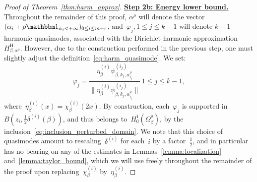 \documentclass[10pt]{article}
\newcommand{\1}{\mathbbm 1}
\newcommand{\deltaRadius}[1]{\delta^{(#1)}} %
\newcommand{\shift}{\rho} %
\begin{document}
\begin{proof}[Proof of Theorem~\ref{thm:harm_approx}]
        {\underline{\bf Step 2b: Energy lower bound.}\newline}
        Throughout the remainder of this proof, $\alpha^\shift$ will denote the vector~$(\alpha_i+\shift\1_{\alpha_i<+\infty})_{0\leq i\leq m+r}$, and~$\varphi_{j}, 1\leq j \leq k-1$ will denote $k-1$ harmonic quasimodes, associated with the Dirichlet harmonic approximation~$H^{\mathrm{H}}_{\beta,\alpha^\shift}$.
        However, due to the construction performed in the previous step, one must slightly adjust the definition~\eqref{eq:harm_quasimode}.
        We set:
        \[\varphi_j = \frac{\eta_\beta^{(i)}\psi_{\beta,k_j,\alpha^\shift_{i_j}}^{(i_j)}}{\|\eta_\beta^{(i)}\psi_{\beta,k_j,\alpha^\shift_{i_j}}^{(i_j)}\|}\,1\leq j\leq k-1,\]
        where~$\eta_\beta^{(i)}(x) = \chi_\beta^{(i)}(2x)$.
        By construction, each~$\varphi_j$ is supported in~$B(z_i,\frac12\deltaRadius{i}(\beta))$, and thus belongs to~$H_0^1(\Omega_\beta^\shift)$, by the inclusion~\eqref{eq:inclusion_perturbed_domain}.
        We note that this choice of quasimodes amount to rescaling~$\deltaRadius{i}$ for each~$i$ by a factor~$\frac12$, and in particular has no bearing on any of the estimates in Lemmas~\ref{lemma:localization} and~\ref{lemma:taylor_bound}, which we will use freely throughout the remainder of the proof upon replacing~$\chi_\beta^{(i)}$ by~$\eta_\beta^{(i)}$.


\end{proof}
\end{document}
